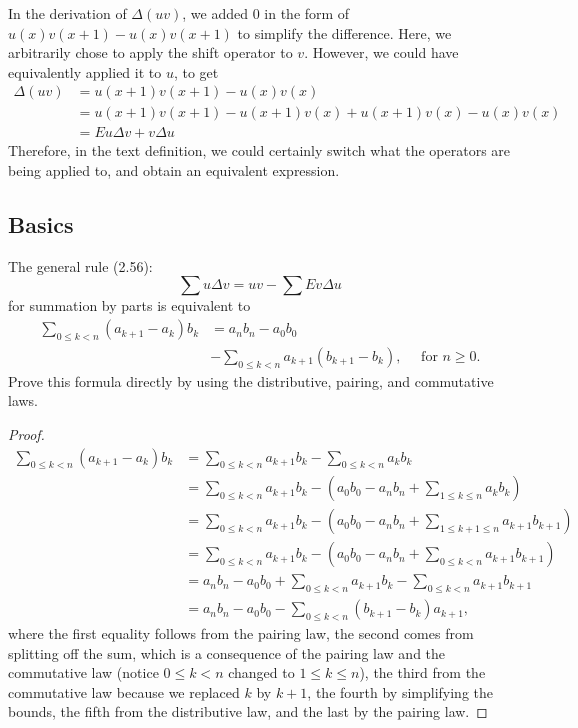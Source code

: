 \documentclass[12pt]{article}
\newenvironment{ex}[2][Exercise]{\begin{trivlist}
		\item[\hskip \labelsep {\bfseries #1}\hskip \labelsep {\bfseries #2.}]}{\end{trivlist}}
\newenvironment{sol}[1][Solution]{\begin{trivlist}
		\item[\hskip \labelsep {\bfseries #1:}]}{\end{trivlist}}
\begin{document}
\begin{sol}
	In the derivation of $\Delta (uv)$, we added 0 in the form of $u(x)v(x+1)-u(x)v(x+1)$ to
	simplify the difference. Here, we arbitrarily chose to apply the shift operator to $v$.
	However, we could have equivalently applied it to $u$, to get
	\begin{align*}
		\Delta(uv)&=u(x+1)v(x+1)-u(x)v(x)\\
		&=u(x+1)v(x+1)-u(x+1)v(x)+u(x+1)v(x)-u(x)v(x)\\
		&=Eu\Delta v+ v\Delta u
	\end{align*}
	Therefore, in the text definition, we could certainly switch what the operators are
	being applied to, and obtain an equivalent expression.
\end{sol}
\subsection*{Basics}
\begin{ex}{11}
	The general rule (2.56):
	\[
	\sum u\Delta v=uv-\sum Ev\Delta u
	\]
	 for summation by parts is equivalent to
	 \begin{align*}
	 	\sum_{0\leq k< n}(a_{k+1}-a_k)b_k&=a_nb_n-a_0b_0\\
	 	&-\sum_{0\leq k< n}a_{k+1}(b_{k+1}-b_k),\quad \text{ for } n\geq 0.
	 \end{align*}
	 Prove this formula directly by using the distributive, pairing, and commutative
	 laws.
\end{ex}

\begin{sol}
	\begin{proof}
		\begin{align*}
			\sum_{0\leq k< n}(a_{k+1}-a_k)b_k
			&=\sum_{0\leq k< n}a_{k+1}b_k-\sum_{0\leq k< n}a_{k}b_k\\
			&=\sum_{0\leq k< n}a_{k+1}b_k-\left(a_0b_0-a_nb_n+\sum_{1\leq k\leq n}a_{k}b_k\right)\\
			&=\sum_{0\leq k< n}a_{k+1}b_k-\left(a_0b_0-a_nb_n+\sum_{1\leq k+1 \leq n}a_{k+1}b_{k+1}\right)\\
			&=\sum_{0\leq k< n}a_{k+1}b_k-\left(a_0b_0-a_nb_n+\sum_{0\leq k <n}a_{k+1}b_{k+1}\right)\\
			&=a_nb_n-a_0b_0+\sum_{0\leq k<n}a_{k+1}b_k-\sum_{0\leq k<n}a_{k+1}b_{k+1}\\
			&=a_nb_n-a_0b_0-\sum_{0\leq k<n}(b_{k+1}-b_k)a_{k+1},
		\end{align*}
		where the first equality follows from the pairing law, the second comes from
		splitting off the sum, which is a consequence of the pairing
		law and the commutative law (notice $0\leq k<n$ changed to $1\leq k\leq n$),
		the third from the commutative law because we replaced $k$ by $k+1$, the fourth
		by simplifying the bounds, the fifth from the distributive law, and the last
		by the pairing law.
	\end{proof}
\end{sol}
\end{document}
